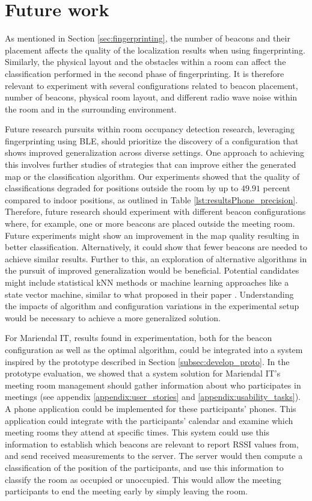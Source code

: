 \chapter{Future work}
As mentioned in Section \ref{sec:fingerprinting}, the number of beacons and their placement affects the quality of the localization results when using fingerprinting. 
Similarly, the physical layout and the obstacles within a room can affect the classification performed in the second phase of fingerprinting. 
It is therefore relevant to experiment with several configurations related to beacon placement, number of beacons, physical room layout, and different radio wave noise within the room and in the surrounding environment. 

Future research pursuits within room occupancy detection research, leveraging fingerprinting using BLE, should prioritize the discovery of a configuration that shows improved generalization across diverse settings. 
One approach to achieving this involves further studies of strategies that can improve either the generated map or the classification algorithm.
Our experiments showed that the quality of classifications degraded for positions outside the room by up to $49.91$ percent compared to indoor positions, as outlined in Table \ref{lst:resultsPhone_precision}. Therefore, future research should experiment with different beacon configurations where, for example, one or more beacons are placed outside the meeting room. 
Future experiments might show an improvement in the map quality resulting in better classification. Alternatively, it could show that fewer beacons are needed to achieve similar results. 
Further to this, an exploration of alternative algorithms in the pursuit of improved generalization would be beneficial.
Potential candidates might include statistical kNN methods or machine learning approaches like a state vector machine, similar to what \citeauthor{ble_kneares_neural} proposed in their paper \cite{ble_kneares_neural}. 
Understanding the impacts of algorithm and configuration variations in the experimental setup would be necessary to achieve a more generalized solution.

For Mariendal IT, results found in experimentation, both for the beacon configuration as well as the optimal algorithm, could be integrated into a system inspired by the prototype described in Section \ref{subsec:develop_proto}. 
In the prototype evaluation, we showed that a system solution for Mariendal IT's meeting room management should gather information about who participates in meetings (see appendix \ref{appendix:user_stories} and \ref{appendix:usability_tasks}).
A phone application could be implemented for these participants' phones. 
This application could integrate with the participants' calendar and examine which meeting rooms they attend at specific times.
This system could use this information to establish which beacons are relevant to report RSSI values from, and send received measurements to the server. 
The server would then compute a classification of the position of the participants, and use this information to classify the room as occupied or unoccupied. 
This would allow the meeting participants to end the meeting early by simply leaving the room.

